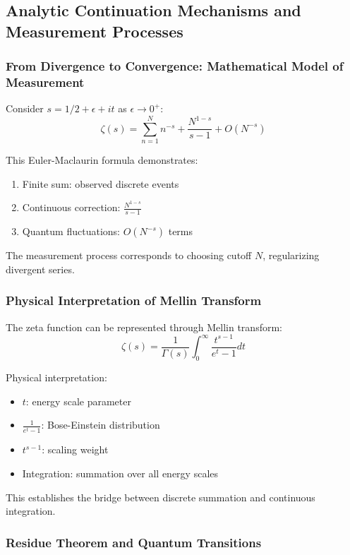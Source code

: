 \documentclass[11pt]{article}
\theoremstyle{plain}
\theoremstyle{definition}
\theoremstyle{remark}
\begin{document}
\subsection{Analytic Continuation Mechanisms and Measurement Processes}

\subsubsection{From Divergence to Convergence: Mathematical Model of Measurement}

Consider $s = 1/2 + \epsilon + it$ as $\epsilon \to 0^+$:
$$\zeta(s) = \sum_{n=1}^{N} n^{-s} + \frac{N^{1-s}}{s-1} + O(N^{-s})$$

This Euler-Maclaurin formula demonstrates:
\begin{enumerate}
\item Finite sum: observed discrete events
\item Continuous correction: $\frac{N^{1-s}}{s-1}$
\item Quantum fluctuations: $O(N^{-s})$ terms
\end{enumerate}

The measurement process corresponds to choosing cutoff $N$, regularizing divergent series.

\subsubsection{Physical Interpretation of Mellin Transform}

The zeta function can be represented through Mellin transform:
$$\zeta(s) = \frac{1}{\Gamma(s)} \int_0^{\infty} \frac{t^{s-1}}{e^t - 1} dt$$

Physical interpretation:
\begin{itemize}
\item $t$: energy scale parameter
\item $\frac{1}{e^t - 1}$: Bose-Einstein distribution
\item $t^{s-1}$: scaling weight
\item Integration: summation over all energy scales
\end{itemize}

This establishes the bridge between discrete summation and continuous integration.

\subsubsection{Residue Theorem and Quantum Transitions}
\end{document}
